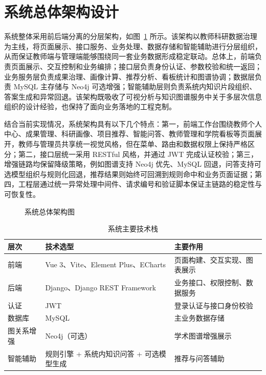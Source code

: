 \documentclass[12pt,a4paper]{ctexbook}
\begin{document}
\section{系统总体架构设计}
系统整体采用前后端分离的分层架构，如图~\ref{fig:system-architecture} 所示。该架构以教师科研数据治理为主线，将页面展示、接口服务、业务处理、数据存储和智能辅助进行分层组织，从而保证教师端与管理端能够围绕同一套业务数据形成稳定联动。总体上，前端负责页面展示、交互控制和业务编排；接口层负责身份认证、参数校验和统一返回；业务服务层负责成果治理、画像计算、推荐分析、看板统计和图谱协调；数据层负责 MySQL 主存储与 Neo4j 可选增强；智能辅助层则负责系统内知识片段组织、答案生成和异常回退。该架构既吸收了可视分析与知识图谱服务中关于多层次信息组织的设计经验，也保持了面向业务落地的工程克制\cite{visual_analytics_2008}\cite{academic_kg_service_2018}。

结合当前实现情况，系统架构具有以下几个特点：第一，前端工作台围绕教师个人中心、成果管理、科研画像、项目推荐、智能问答、教师管理和学院看板等页面展开，教师与管理员共享统一视觉风格，但在菜单、路由和数据权限上保持严格区分；第二，接口层统一采用 RESTful 风格，并通过 JWT 完成认证校验；第三，增强链路均保留降级策略，例如图谱支持 Neo4j 优先、MySQL 回退，问答支持可选模型组织与规则化回退，推荐结果则始终可回溯到规则命中和业务页面证据；第四，工程层通过统一异常处理中间件、请求编号和验证脚本保证主链路的稳定性与可恢复性。

\begin{figure}[H]
  \centering
  
  \caption{系统总体架构图}
  \label{fig:system-architecture}
\end{figure}

\begin{table}[H]
  \centering
  \caption{系统主要技术栈}
  \label{tab:tech-stack}
  \begin{tabular}{p{3cm}p{3cm}p{6cm}}
    \toprule
    层次 & 技术选型 & 主要作用 \\
    \midrule
    前端 & Vue 3、Vite、Element Plus、ECharts & 页面构建、交互实现、图表展示 \\
    后端 & Django、Django REST Framework & 业务接口、权限控制、数据服务 \\
    认证 & JWT & 登录认证与接口身份校验 \\
    数据库 & MySQL & 主业务数据存储 \\
    图关系增强 & Neo4j（可选） & 学术图谱增强展示 \\
    智能辅助 & 规则引擎 + 系统内知识问答 + 可选模型生成 & 推荐与问答辅助 \\
    \bottomrule
  \end{tabular}
\end{table}
\end{document}
